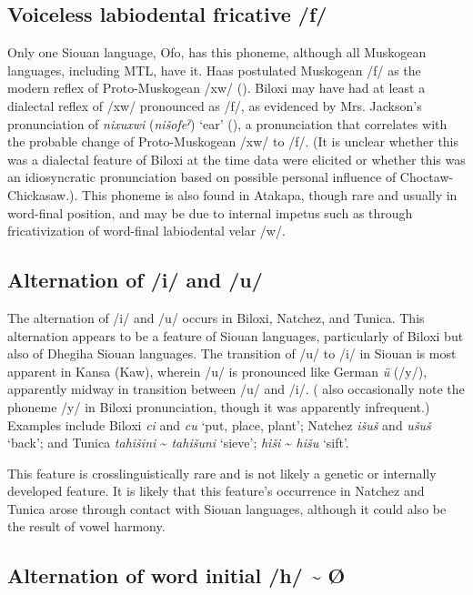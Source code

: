 \documentclass[output=paper]{LSP/langsci}
\begin{document}
\subsection{Voiceless labiodental fricative /f/}

Only one Siouan language, Ofo, has this phoneme, although all Muskogean languages, including MTL, have it. Haas postulated Muskogean /f/ as the modern reflex of Proto-Muskogean /xw/ (\citeyear[36]{Haas1969}). Biloxi may have had at least a dialectal reflex of /xw/ pronounced as /f/, as evidenced by Mrs. Jackson’s pronunciation of \emph{nixuxwi} (\emph{nišofeˀ}) `ear' (\citealt[79]{HaasSwadesh1968}), a pronunciation that correlates with the probable change of Proto-Muskogean /xw/ to /f/. (It is unclear whether this was a dialectal feature of Biloxi at the time data were elicited or whether this was an idiosyncratic pronunciation based on possible personal influence of Choctaw-Chickasaw.). This phoneme is also found in Atakapa, though rare and usually in word-final position, and may be due to internal impetus such as through fricativization of word-final labiodental velar /w/.

\subsection{Alternation of /i/ and /u/}
	
The alternation of /i/ and /u/ occurs in Biloxi, Natchez, and Tunica. This alternation appears to be a feature of Siouan languages, particularly of Biloxi but also of Dhegiha Siouan languages. The transition of /u/ to /i/ in Siouan is most apparent in Kansa (Kaw), wherein /u/ is pronounced like German \emph{ü} (/y/), apparently midway in transition between /u/ and /i/. (\citealt{DorseySwanton1912} also occasionally note the phoneme /y/ in Biloxi pronunciation, though it was apparently infrequent.) Examples include Biloxi \emph{ci} and \emph{cu} `put, place, plant'; Natchez \emph{išuš} and \emph{ušuš} `back'; and Tunica \emph{tahišini} \textasciitilde{} \emph{tahišuni} `sieve';  \emph{hiši} \textasciitilde{} \emph{hišu} `sift'.

This feature is crosslinguistically rare and is not likely a genetic or internally developed feature. It is likely that this feature’s occurrence in Natchez and Tunica arose through contact with Siouan languages, although it could also be the result of vowel harmony. 

\subsection{Alternation of word initial /h/ \textasciitilde{} Ø}
\end{document}
